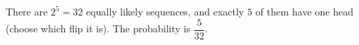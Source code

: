 There are $2^5=32$ equally likely sequences, and exactly $5$ of them have one head (choose which flip it is). The probability is $\boxed{\dfrac{5}{32}}$.
